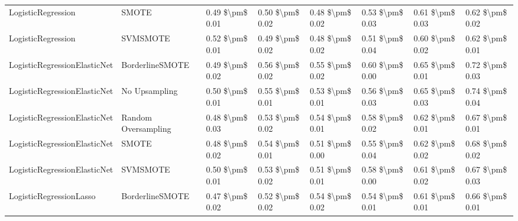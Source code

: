 \begin{tabular}{llllllll}
             LogisticRegression &                         SMOTE &     0.49 \$\textbackslash pm\$ 0.01 &           0.50 \$\textbackslash pm\$ 0.02 &       0.48 \$\textbackslash pm\$ 0.02 &        0.53 \$\textbackslash pm\$ 0.03 &                         0.61 \$\textbackslash pm\$ 0.03 & 0.62 \$\textbackslash pm\$ 0.02 \\
             LogisticRegression &                      SVMSMOTE &     0.52 \$\textbackslash pm\$ 0.01 &           0.49 \$\textbackslash pm\$ 0.02 &       0.48 \$\textbackslash pm\$ 0.02 &        0.51 \$\textbackslash pm\$ 0.04 &                         0.60 \$\textbackslash pm\$ 0.02 & 0.62 \$\textbackslash pm\$ 0.01 \\
   LogisticRegressionElasticNet &               BorderlineSMOTE &     0.49 \$\textbackslash pm\$ 0.02 &           0.56 \$\textbackslash pm\$ 0.02 &       0.55 \$\textbackslash pm\$ 0.02 &        0.60 \$\textbackslash pm\$ 0.00 &                         0.65 \$\textbackslash pm\$ 0.01 & 0.72 \$\textbackslash pm\$ 0.03 \\
   LogisticRegressionElasticNet &                 No Upsampling &     0.50 \$\textbackslash pm\$ 0.01 &           0.55 \$\textbackslash pm\$ 0.01 &       0.53 \$\textbackslash pm\$ 0.01 &        0.56 \$\textbackslash pm\$ 0.03 &                         0.65 \$\textbackslash pm\$ 0.03 & 0.74 \$\textbackslash pm\$ 0.04 \\
   LogisticRegressionElasticNet &           Random Oversampling &     0.48 \$\textbackslash pm\$ 0.03 &           0.53 \$\textbackslash pm\$ 0.02 &       0.54 \$\textbackslash pm\$ 0.01 &        0.58 \$\textbackslash pm\$ 0.02 &                         0.62 \$\textbackslash pm\$ 0.01 & 0.67 \$\textbackslash pm\$ 0.01 \\
   LogisticRegressionElasticNet &                         SMOTE &     0.48 \$\textbackslash pm\$ 0.02 &           0.54 \$\textbackslash pm\$ 0.01 &       0.51 \$\textbackslash pm\$ 0.00 &        0.55 \$\textbackslash pm\$ 0.04 &                         0.62 \$\textbackslash pm\$ 0.02 & 0.68 \$\textbackslash pm\$ 0.02 \\
   LogisticRegressionElasticNet &                      SVMSMOTE &     0.50 \$\textbackslash pm\$ 0.01 &           0.53 \$\textbackslash pm\$ 0.02 &       0.51 \$\textbackslash pm\$ 0.01 &        0.58 \$\textbackslash pm\$ 0.00 &                         0.61 \$\textbackslash pm\$ 0.02 & 0.67 \$\textbackslash pm\$ 0.03 \\
        LogisticRegressionLasso &               BorderlineSMOTE &     0.47 \$\textbackslash pm\$ 0.02 &           0.52 \$\textbackslash pm\$ 0.02 &       0.54 \$\textbackslash pm\$ 0.02 &        0.54 \$\textbackslash pm\$ 0.01 &                         0.61 \$\textbackslash pm\$ 0.01 & 0.66 \$\textbackslash pm\$ 0.01 \\

\end{tabular}
